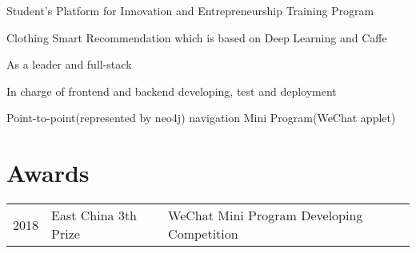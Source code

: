 \documentclass[]{deedy-resume-openfont}
\begin{document}
\begin{minipage}[t]{0.73\textwidth}
\begin{tightemize}
    \item Student's Platform for Innovation and Entrepreneurship Training Program
    \item Clothing Smart Recommendation which is based on Deep Learning and Caffe
\end{tightemize}

\sectionsep

\begin{tightemize}
    \item As a leader and full-stack
    \item In charge of frontend and backend developing, test and deployment
    \item Point-to-point(represented by neo4j) navigation Mini Program(WeChat applet)
\end{tightemize}
\sectionsep




\section{Awards} 
\begin{tabular}{rll}
2018         & East China 3th Prize  & WeChat Mini Program Developing Competition \\
\end{tabular}
\sectionsep


% 
% 

\end{minipage} 
\end{document}
